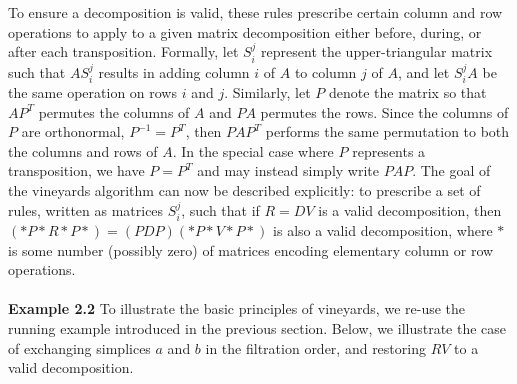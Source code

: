 \documentclass[sn-mathphys]{sn-jnl}
\begin{document}
To ensure a decomposition is valid, these rules prescribe certain column and row operations to apply to a given matrix decomposition either before, during, or after each transposition.   
Formally, let $S_{i}^j$ represent the upper-triangular matrix such that $A S_{i}^j$ results in adding column $i$ of $A$ to column $j$ of $A$, and let $S_{i}^j A$ be the same operation on rows $i$ and $j$.
Similarly, let $P$ denote the matrix so that $A P^T$ permutes the columns of $A$ and $P A$ permutes the rows.
Since the columns of $P$ are orthonormal, $P^{-1} = P^T$, then $P A P^T$ performs the same permutation to both the columns and rows of $A$. In the special case where $P$ represents a transposition, we have $P = P^T$ and may instead simply write $P A P$. 
The goal of the vineyards algorithm can now be described explicitly: to prescribe a set of rules, written as matrices $S_{i}^{j}$, such that if $R = D V$ is a valid decomposition, then $(\ast P \ast R \ast P \ast) = (PDP)(\ast P\ast V \ast P \ast)$ is also a valid decomposition, where $\ast$ is some number (possibly zero) of matrices encoding elementary column or row operations. 
\\
\\
\noindent 
\textbf{Example 2.2} To illustrate the basic principles of vineyards, we re-use the running example introduced in the previous section. Below, we illustrate the case of exchanging simplices $a$ and $b$ in the filtration order, and restoring $RV$ to a valid decomposition. 
\end{document}
